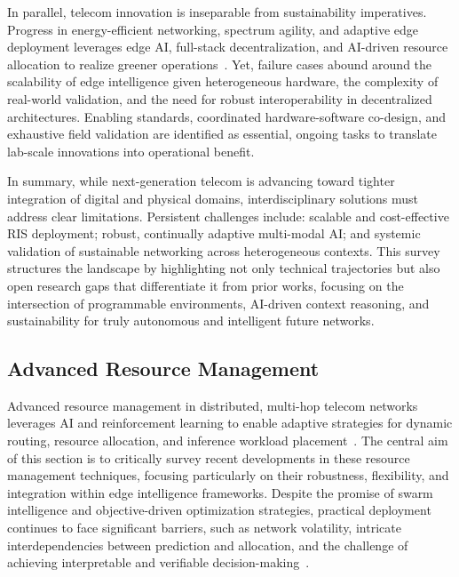 \documentclass[sigconf]{acmart}
\begin{document}
In parallel, telecom innovation is inseparable from sustainability imperatives. Progress in energy-efficient networking, spectrum agility, and adaptive edge deployment leverages edge AI, full-stack decentralization, and AI-driven resource allocation to realize greener operations~\cite{ref17,ref18,ref26,ref28,ref29,ref30,ref35,ref39,ref40}. Yet, failure cases abound around the scalability of edge intelligence given heterogeneous hardware, the complexity of real-world validation, and the need for robust interoperability in decentralized architectures. Enabling standards, coordinated hardware-software co-design, and exhaustive field validation are identified as essential, ongoing tasks to translate lab-scale innovations into operational benefit.

In summary, while next-generation telecom is advancing toward tighter integration of digital and physical domains, interdisciplinary solutions must address clear limitations. Persistent challenges include: scalable and cost-effective RIS deployment; robust, continually adaptive multi-modal AI; and systemic validation of sustainable networking across heterogeneous contexts. This survey structures the landscape by highlighting not only technical trajectories but also open research gaps that differentiate it from prior works, focusing on the intersection of programmable environments, AI-driven context reasoning, and sustainability for truly autonomous and intelligent future networks.

\subsection{Advanced Resource Management}

Advanced resource management in distributed, multi-hop telecom networks leverages AI and reinforcement learning to enable adaptive strategies for dynamic routing, resource allocation, and inference workload placement~\cite{ref48}. The central aim of this section is to critically survey recent developments in these resource management techniques, focusing particularly on their robustness, flexibility, and integration within edge intelligence frameworks. Despite the promise of swarm intelligence and objective-driven optimization strategies, practical deployment continues to face significant barriers, such as network volatility, intricate interdependencies between prediction and allocation, and the challenge of achieving interpretable and verifiable decision-making~\cite{ref48}.
\end{document}
